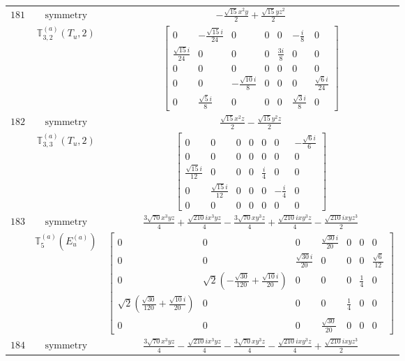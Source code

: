 \documentclass[fleqn,8pt,landscape]{jsarticle}
\begin{document}
\begin{longtable}{ccc}
$ 181 $ & $ \text{symmetry} $ & $ - \frac{\sqrt{15} x^{2} y}{2} + \frac{\sqrt{15} y z^{2}}{2} $ \\
$  $ & $ \mathbb{T}_{3,2}^{(a)}(T_{u},2) $ & $ \begin{bmatrix} 0 & - \frac{\sqrt{15} i}{24} & 0 & 0 & 0 & - \frac{i}{8} & 0 \\ \frac{\sqrt{15} i}{24} & 0 & 0 & 0 & \frac{3 i}{8} & 0 & 0 \\ 0 & 0 & 0 & 0 & 0 & 0 & 0 \\ 0 & 0 & - \frac{\sqrt{10} i}{8} & 0 & 0 & 0 & \frac{\sqrt{6} i}{24} \\ 0 & \frac{\sqrt{5} i}{8} & 0 & 0 & 0 & \frac{\sqrt{3} i}{8} & 0 \end{bmatrix} $ \\ \hline
$ 182 $ & $ \text{symmetry} $ & $ \frac{\sqrt{15} x^{2} z}{2} - \frac{\sqrt{15} y^{2} z}{2} $ \\
$  $ & $ \mathbb{T}_{3,3}^{(a)}(T_{u},2) $ & $ \begin{bmatrix} 0 & 0 & 0 & 0 & 0 & 0 & - \frac{\sqrt{6} i}{6} \\ 0 & 0 & 0 & 0 & 0 & 0 & 0 \\ \frac{\sqrt{15} i}{12} & 0 & 0 & 0 & \frac{i}{4} & 0 & 0 \\ 0 & \frac{\sqrt{15} i}{12} & 0 & 0 & 0 & - \frac{i}{4} & 0 \\ 0 & 0 & 0 & 0 & 0 & 0 & 0 \end{bmatrix} $ \\ \hline
$ 183 $ & $ \text{symmetry} $ & $ \frac{3 \sqrt{70} x^{3} y z}{4} + \frac{\sqrt{210} i x^{3} y z}{4} - \frac{3 \sqrt{70} x y^{3} z}{4} + \frac{\sqrt{210} i x y^{3} z}{4} - \frac{\sqrt{210} i x y z^{3}}{2} $ \\
$  $ & $ \mathbb{T}_{5}^{(a)}(E_{u}^{(a)}) $ & $ \begin{bmatrix} 0 & 0 & 0 & \frac{\sqrt{30} i}{20} & 0 & 0 & 0 \\ 0 & 0 & \frac{\sqrt{30} i}{20} & 0 & 0 & 0 & \frac{\sqrt{6}}{12} \\ 0 & \sqrt{2} \left(- \frac{\sqrt{30}}{120} + \frac{\sqrt{10} i}{20}\right) & 0 & 0 & 0 & \frac{1}{4} & 0 \\ \sqrt{2} \left(\frac{\sqrt{30}}{120} + \frac{\sqrt{10} i}{20}\right) & 0 & 0 & 0 & \frac{1}{4} & 0 & 0 \\ 0 & 0 & 0 & \frac{\sqrt{30}}{20} & 0 & 0 & 0 \end{bmatrix} $ \\ \hline
$ 184 $ & $ \text{symmetry} $ & $ \frac{3 \sqrt{70} x^{3} y z}{4} - \frac{\sqrt{210} i x^{3} y z}{4} - \frac{3 \sqrt{70} x y^{3} z}{4} - \frac{\sqrt{210} i x y^{3} z}{4} + \frac{\sqrt{210} i x y z^{3}}{2} $ \\

\end{longtable}
\end{document}
